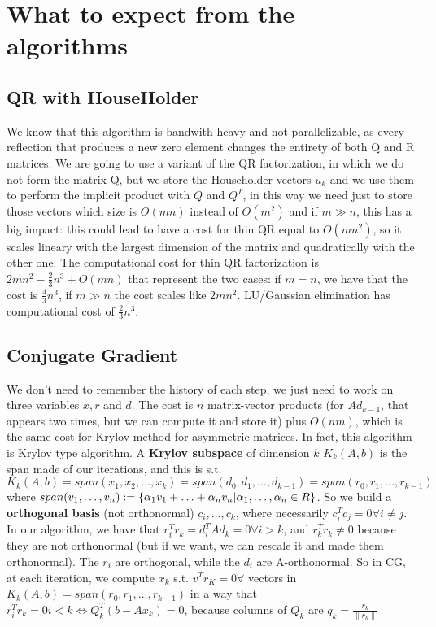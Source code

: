 \documentclass{article}
\begin{document}
\section{What to expect from the algorithms}

\subsection{QR with HouseHolder}
We know that this algorithm is bandwith heavy and not parallelizable, as every reflection that produces a new zero element changes the entirety of both Q and R matrices.
We are going to use a variant of the QR factorization, in which we do not form the matrix Q, but we store the Householder vectors $u_k$ and we use them to perform the implicit product with $Q$ and $Q^T$, in this way we need just to store those vectors which size is $O(mn)$ instead of $O(m^2)$ and if $m \gg n$, this has a big impact: this could lead to have a cost for thin QR equal to $O(mn^2)$, so it scales lineary with the largest dimension of the matrix and quadratically with the other one. The computational cost for thin QR factorization is $2mn^2 - \frac{2}{3}n^3 + O(mn)$ that represent the two cases: if $m = n$, we have that the cost is $\frac{4}{3}n^3$, if $m \gg n$ the cost scales like $2mn^2$. LU/Gaussian elimination has computational cost of $\frac{2}{3}n^3$.
\subsection{Conjugate Gradient}
We don't need to remember the history of each step, we just need to work on three variables $x, r$ and $d$. The cost is $n$ matrix-vector products (for $Ad_{k-1}$, that appears two times, but we can compute it and store it) plus $O(nm)$, which is the same cost for Krylov method for asymmetric matrices. In fact, this algorithm is Krylov type algorithm.
A \textbf{Krylov subspace} of dimension $k$ $K_{k}(A, b)$ is the span made of our iterations, and this is s.t. $K_{k}(A, b) = span(x_{1}, x_{2}, \hdots, x_{k}) = span(d_{0}, d_{1}, \hdots, d_{k-1}) = span(r_{0}, r_{1}, \hdots, r_{k-1})$ where $span(v_{1}, \hdots, v_{n}) := \{\alpha_{1}v_{1} + \hdots + \alpha_{n}v_{n}\\| \alpha_{1}, \hdots, \alpha_{n} \in R\}$.
So we build a \textbf{orthogonal basis} (not orthonormal) $c_{i}, \hdots, c_{k}$, where necessarily $c_{i}^{T}c_{j} = 0  \forall i \neq j$. In our algorithm, we have that $r_{i}^{T}r_{k} = d_{i}^{T}Ad_{k} = 0 \forall i > k$, and $r_{k}^{T}r_{k} \neq 0$ because they are not orthonormal (but if we want, we can rescale it and made them orthonormal). The $r_{i}$ are orthogonal, while the $d_{i}$ are A-orthonormal.
So in CG, at each iteration, we compute $x_{k}$ s.t. $v^{T}r_{K} = 0 \forall$ vectors in $K_{k}(A, b) = span(r_{0}, r_{1}, \hdots, r_{k-1})$ in a way that $r_{i}^{T}r_{k} = 0 i < k \iff Q_{k}^{T}(b - Ax_{k}) = 0$, because columns of $Q_{k}$ are $q_{k} = \frac{r_{k}}{\|r_{k}\|}$
\end{document}
